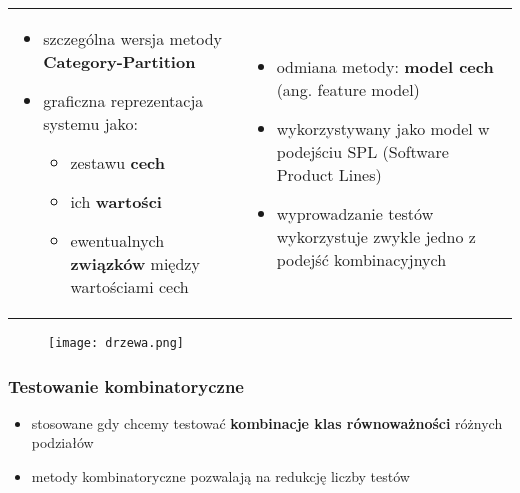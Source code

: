 \documentclass[../main.tex]{subfiles}
\begin{document}
    \begin{table}[H]
        \begin{center}
            \begin{tabular}{ p{8cm} p{8cm}}
                \begin{itemize}
                    \item szczególna wersja metody \textbf{Category-Partition}
                    \item graficzna reprezentacja systemu jako:
                    \begin{itemize}
                        \item zestawu \textbf{cech}
                        \item ich \textbf{wartości}
                        \item ewentualnych \textbf{związków} między wartościami cech
                    \end{itemize}
                \end{itemize}

                &
                \begin{itemize}
                    \item odmiana metody: \textbf{model cech} (ang. feature model)
                    \item wykorzystywany jako model w podejściu SPL (Software Product Lines)
                    \item wyprowadzanie testów wykorzystuje zwykle jedno z podejść
                    kombinacyjnych
                \end{itemize}

            \end{tabular}
        \end{center}
    \end{table}

    \begin{figure}[H]
        \texttt{[image: drzewa.png]}
    \end{figure}

    \subsubsection{Testowanie kombinatoryczne}
    \begin{itemize}
        \item stosowane gdy chcemy testować \textbf{kombinacje klas równoważności}
        różnych podziałów
        \item metody kombinatoryczne pozwalają na redukcję liczby testów
    \end{itemize}
\end{document}
